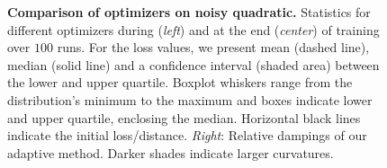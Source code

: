 \begin{figure}[t]
\vspace{-2.0ex}
\caption{\textbf{Comparison of optimizers on noisy quadratic.} Statistics for
  different optimizers during (\textit{left}) and at the end (\textit{center})
  of training over $100$ runs. For the loss values, we present mean (dashed
  line), median (solid line) and a confidence interval (shaded area) between the
  lower and upper quartile. Boxplot whiskers range from the distribution's
  minimum to the maximum and boxes indicate lower and upper quartile, enclosing
  the median. Horizontal black lines indicate the initial loss/distance.
  \textit{Right}: Relative dampings of our adaptive method. Darker shades
  indicate larger curvatures.}
  \label{fig:noisy_quadratic}
\end{figure}

